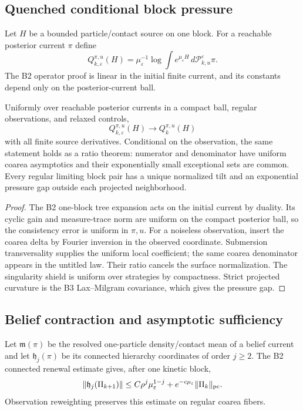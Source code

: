 \subsection{Quenched conditional block pressure}

Let $H$ be a bounded particle/contact source on one block.  For a reachable
posterior current $\pi$ define
\[
 Q_{k,\varepsilon}^{\pi,u}(H)
 =\mu_\varepsilon^{-1}
  \log\int e^{\mu_\varepsilon H}
  \,d\mathcal P_{k,u}^\varepsilon\pi.
\]
The B2 operator proof is linear in the initial finite current, and its
constants depend only on the posterior-current ball.

\begin{theorem}
\label{thm:r7-c1-quenched}
Uniformly over reachable posterior currents in a compact ball, regular
observations, and relaxed controls,
\[
 Q_{k,\varepsilon}^{\pi,u}(H)\longrightarrow Q_k^{\pi,u}(H)
\]
with all finite source derivatives.  Conditional on the observation, the same
statement holds as a ratio theorem: numerator and denominator have uniform
coarea asymptotics and their exponentially small exceptional sets are common.
Every regular limiting block pair has a unique normalized tilt and an
exponential pressure gap outside each projected neighborhood.
\end{theorem}

\begin{proof}
The B2 one-block tree expansion acts on the initial current by duality.  Its
cyclic gain and measure-trace norm are uniform on the compact posterior ball,
so the consistency error is uniform in $\pi,u$.  For a noiseless observation,
insert the coarea delta by Fourier inversion in the observed coordinate.
Submersion transversality supplies the uniform local coefficient; the same
coarea denominator appears in the untitled law.  Their ratio cancels the
surface normalization.  The singularity shield is uniform over strategies by
compactness.  Strict projected curvature is the B3 Lax--Milgram covariance,
which gives the pressure gap.
\end{proof}

\subsection{Belief contraction and asymptotic sufficiency}

Let $\mathfrak m(\pi)$ be the resolved one-particle density/contact mean of a
belief current and let $\mathfrak h_j(\pi)$ be its connected hierarchy
coordinates of order $j\ge2$.  The B2 connected renewal estimate gives, after
one kinetic block,
\[
 \|\mathfrak h_j(\Pi_{k+1})\|
 \le C\rho^j\mu_\varepsilon^{1-j}
 +e^{-c\mu_\varepsilon}\|\Pi_k\|_{\rm pc}.
\]
Observation reweighting preserves this estimate on regular coarea fibers.

